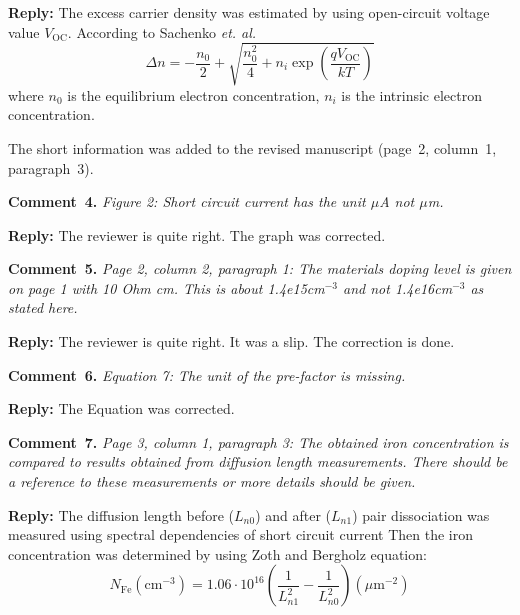 \documentclass[sn-mathphys]{sn-jnl}
\begin{document}
\noindent
\textcolor[rgb]{0.51,0.00,0.00}{\textbf{Reply:}}
The excess carrier density was estimated by using open-circuit voltage value $V_\mathrm{OC}$.
According to Sachenko \emph{et. al.}\cite{JAPSach}
\begin{equation}
  \Delta n=-\frac{n_0}{2}+\sqrt{\frac{n_0^2}{4}+n_i\exp\left(\frac{qV_\mathrm{OC}}{kT}\right)}
\end{equation}
where
$n_0$ is the equilibrium electron concentration,
$n_i$ is the intrinsic electron concentration.

The short information was added to the revised manuscript (page~2, column~1, paragraph~3).


\vspace{1cm}
\noindent
\textcolor[rgb]{0.00,0.50,1.00}{\textbf{Comment~4.}}
\emph{Figure 2: Short circuit current has the unit $\mu$A not $\mu$m.}

\noindent
\textcolor[rgb]{0.51,0.00,0.00}{\textbf{Reply:}}
The reviewer is quite right.
The graph was corrected.


\vspace{1cm}
\noindent
\textcolor[rgb]{0.00,0.50,1.00}{\textbf{Comment~5.}}
\emph{Page 2, column 2, paragraph 1: The materials doping level is given on page 1 with 10 Ohm cm. This is about 1.4e15cm$^{-3}$ and not 1.4e16cm$^{-3}$ as stated here.}

\noindent
\textcolor[rgb]{0.51,0.00,0.00}{\textbf{Reply:}}
The reviewer is quite right.
It was a slip.
The correction is done.


\vspace{1cm}
\noindent
\textcolor[rgb]{0.00,0.50,1.00}{\textbf{Comment~6.}}
\emph{Equation 7: The unit of the pre-factor is missing. }

\noindent
\textcolor[rgb]{0.51,0.00,0.00}{\textbf{Reply:}}
The Equation was corrected.

\vspace{1cm}
\noindent
\textcolor[rgb]{0.00,0.50,1.00}{\textbf{Comment~7.}}
\emph{Page 3, column 1, paragraph 3: The obtained iron concentration is compared to results obtained from diffusion length measurements. There should be a reference to these measurements or more details should be given.}

\noindent
\textcolor[rgb]{0.51,0.00,0.00}{\textbf{Reply:}}
The diffusion length before ($L_{n0}$) and after ($L_{n1}$) pair dissociation was measured using spectral dependencies of short circuit current
Then the iron concentration was determined by using Zoth and Bergholz\cite{FeB_Zong} equation:
\begin{equation}
  N_\mathrm{Fe}(\mathrm{cm}^{-3})=1.06\cdot10^{16}\left(\frac{1}{L_{n1}^2}-\frac{1}{L_{n0}^2}\right)(\mu\mathrm{m}^{-2})
\end{equation}
\end{document}
